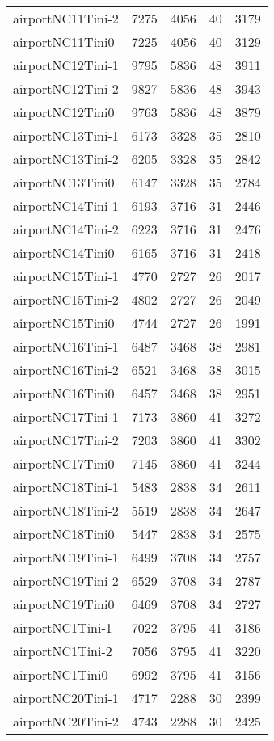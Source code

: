 \begin{longtable}{lrrrr}
airportNC11Tini-2 & 7275 & 4056 & 40 & 3179 \\
airportNC11Tini0 & 7225 & 4056 & 40 & 3129 \\
airportNC12Tini-1 & 9795 & 5836 & 48 & 3911 \\
airportNC12Tini-2 & 9827 & 5836 & 48 & 3943 \\
airportNC12Tini0 & 9763 & 5836 & 48 & 3879 \\
airportNC13Tini-1 & 6173 & 3328 & 35 & 2810 \\
airportNC13Tini-2 & 6205 & 3328 & 35 & 2842 \\
airportNC13Tini0 & 6147 & 3328 & 35 & 2784 \\
airportNC14Tini-1 & 6193 & 3716 & 31 & 2446 \\
airportNC14Tini-2 & 6223 & 3716 & 31 & 2476 \\
airportNC14Tini0 & 6165 & 3716 & 31 & 2418 \\
airportNC15Tini-1 & 4770 & 2727 & 26 & 2017 \\
airportNC15Tini-2 & 4802 & 2727 & 26 & 2049 \\
airportNC15Tini0 & 4744 & 2727 & 26 & 1991 \\
airportNC16Tini-1 & 6487 & 3468 & 38 & 2981 \\
airportNC16Tini-2 & 6521 & 3468 & 38 & 3015 \\
airportNC16Tini0 & 6457 & 3468 & 38 & 2951 \\
airportNC17Tini-1 & 7173 & 3860 & 41 & 3272 \\
airportNC17Tini-2 & 7203 & 3860 & 41 & 3302 \\
airportNC17Tini0 & 7145 & 3860 & 41 & 3244 \\
airportNC18Tini-1 & 5483 & 2838 & 34 & 2611 \\
airportNC18Tini-2 & 5519 & 2838 & 34 & 2647 \\
airportNC18Tini0 & 5447 & 2838 & 34 & 2575 \\
airportNC19Tini-1 & 6499 & 3708 & 34 & 2757 \\
airportNC19Tini-2 & 6529 & 3708 & 34 & 2787 \\
airportNC19Tini0 & 6469 & 3708 & 34 & 2727 \\
airportNC1Tini-1 & 7022 & 3795 & 41 & 3186 \\
airportNC1Tini-2 & 7056 & 3795 & 41 & 3220 \\
airportNC1Tini0 & 6992 & 3795 & 41 & 3156 \\
airportNC20Tini-1 & 4717 & 2288 & 30 & 2399 \\
airportNC20Tini-2 & 4743 & 2288 & 30 & 2425 \\

\end{longtable}
